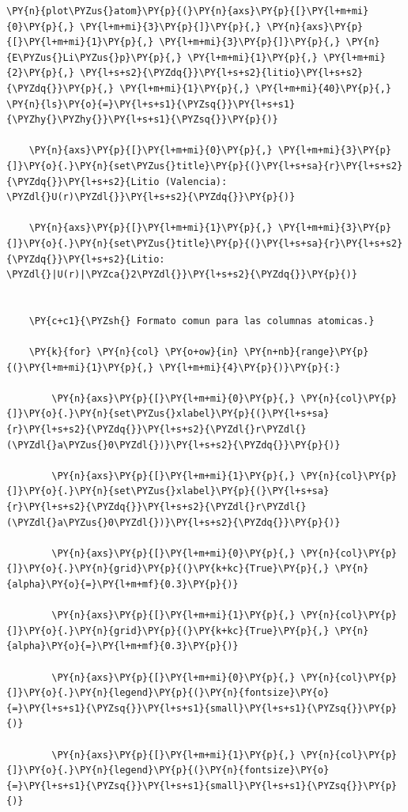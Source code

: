 \documentclass[11pt]{article}
\makeatletter
\def\PY@reset{\let\PY@it=\relax \let\PY@bf=\relax \let\PY@ul=\relax \let\PY@tc=\relax \let\PY@bc=\relax \let\PY@ff=\relax}
\def\PY@tok#1{\csname PY@tok@#1\endcsname}
\def\PY@toks#1+{\ifx\relax#1\empty\else \PY@tok{#1}\expandafter\PY@toks\fi}
\def\PY@do#1{\PY@bc{\PY@tc{\PY@ul{\PY@it{\PY@bf{\PY@ff{#1}}}}}}}
\def\PY#1#2{\PY@reset\PY@toks#1+\relax+\PY@do{#2}}
\makeatother
\begin{document}
\begin{tcolorbox}[breakable, size=fbox, boxrule=1pt, pad at break*=1mm,colback=cellbackground, colframe=cellborder]
\begin{Verbatim}[commandchars=\\\{\}]
    \PY{n}{plot\PYZus{}atom}\PY{p}{(}\PY{n}{axs}\PY{p}{[}\PY{l+m+mi}{0}\PY{p}{,} \PY{l+m+mi}{3}\PY{p}{]}\PY{p}{,} \PY{n}{axs}\PY{p}{[}\PY{l+m+mi}{1}\PY{p}{,} \PY{l+m+mi}{3}\PY{p}{]}\PY{p}{,} \PY{n}{E\PYZus{}Li\PYZus{}p}\PY{p}{,} \PY{l+m+mi}{1}\PY{p}{,} \PY{l+m+mi}{2}\PY{p}{,} \PY{l+s+s2}{\PYZdq{}}\PY{l+s+s2}{litio}\PY{l+s+s2}{\PYZdq{}}\PY{p}{,} \PY{l+m+mi}{1}\PY{p}{,} \PY{l+m+mi}{40}\PY{p}{,} \PY{n}{ls}\PY{o}{=}\PY{l+s+s1}{\PYZsq{}}\PY{l+s+s1}{\PYZhy{}\PYZhy{}}\PY{l+s+s1}{\PYZsq{}}\PY{p}{)}

    \PY{n}{axs}\PY{p}{[}\PY{l+m+mi}{0}\PY{p}{,} \PY{l+m+mi}{3}\PY{p}{]}\PY{o}{.}\PY{n}{set\PYZus{}title}\PY{p}{(}\PY{l+s+sa}{r}\PY{l+s+s2}{\PYZdq{}}\PY{l+s+s2}{Litio (Valencia): \PYZdl{}U(r)\PYZdl{}}\PY{l+s+s2}{\PYZdq{}}\PY{p}{)}

    \PY{n}{axs}\PY{p}{[}\PY{l+m+mi}{1}\PY{p}{,} \PY{l+m+mi}{3}\PY{p}{]}\PY{o}{.}\PY{n}{set\PYZus{}title}\PY{p}{(}\PY{l+s+sa}{r}\PY{l+s+s2}{\PYZdq{}}\PY{l+s+s2}{Litio: \PYZdl{}|U(r)|\PYZca{}2\PYZdl{}}\PY{l+s+s2}{\PYZdq{}}\PY{p}{)}


    \PY{c+c1}{\PYZsh{} Formato comun para las columnas atomicas.}

    \PY{k}{for} \PY{n}{col} \PY{o+ow}{in} \PY{n+nb}{range}\PY{p}{(}\PY{l+m+mi}{1}\PY{p}{,} \PY{l+m+mi}{4}\PY{p}{)}\PY{p}{:}

        \PY{n}{axs}\PY{p}{[}\PY{l+m+mi}{0}\PY{p}{,} \PY{n}{col}\PY{p}{]}\PY{o}{.}\PY{n}{set\PYZus{}xlabel}\PY{p}{(}\PY{l+s+sa}{r}\PY{l+s+s2}{\PYZdq{}}\PY{l+s+s2}{\PYZdl{}r\PYZdl{} (\PYZdl{}a\PYZus{}0\PYZdl{})}\PY{l+s+s2}{\PYZdq{}}\PY{p}{)}

        \PY{n}{axs}\PY{p}{[}\PY{l+m+mi}{1}\PY{p}{,} \PY{n}{col}\PY{p}{]}\PY{o}{.}\PY{n}{set\PYZus{}xlabel}\PY{p}{(}\PY{l+s+sa}{r}\PY{l+s+s2}{\PYZdq{}}\PY{l+s+s2}{\PYZdl{}r\PYZdl{} (\PYZdl{}a\PYZus{}0\PYZdl{})}\PY{l+s+s2}{\PYZdq{}}\PY{p}{)}

        \PY{n}{axs}\PY{p}{[}\PY{l+m+mi}{0}\PY{p}{,} \PY{n}{col}\PY{p}{]}\PY{o}{.}\PY{n}{grid}\PY{p}{(}\PY{k+kc}{True}\PY{p}{,} \PY{n}{alpha}\PY{o}{=}\PY{l+m+mf}{0.3}\PY{p}{)}

        \PY{n}{axs}\PY{p}{[}\PY{l+m+mi}{1}\PY{p}{,} \PY{n}{col}\PY{p}{]}\PY{o}{.}\PY{n}{grid}\PY{p}{(}\PY{k+kc}{True}\PY{p}{,} \PY{n}{alpha}\PY{o}{=}\PY{l+m+mf}{0.3}\PY{p}{)}

        \PY{n}{axs}\PY{p}{[}\PY{l+m+mi}{0}\PY{p}{,} \PY{n}{col}\PY{p}{]}\PY{o}{.}\PY{n}{legend}\PY{p}{(}\PY{n}{fontsize}\PY{o}{=}\PY{l+s+s1}{\PYZsq{}}\PY{l+s+s1}{small}\PY{l+s+s1}{\PYZsq{}}\PY{p}{)}

        \PY{n}{axs}\PY{p}{[}\PY{l+m+mi}{1}\PY{p}{,} \PY{n}{col}\PY{p}{]}\PY{o}{.}\PY{n}{legend}\PY{p}{(}\PY{n}{fontsize}\PY{o}{=}\PY{l+s+s1}{\PYZsq{}}\PY{l+s+s1}{small}\PY{l+s+s1}{\PYZsq{}}\PY{p}{)}



\end{Verbatim}
\end{tcolorbox}
\end{document}
